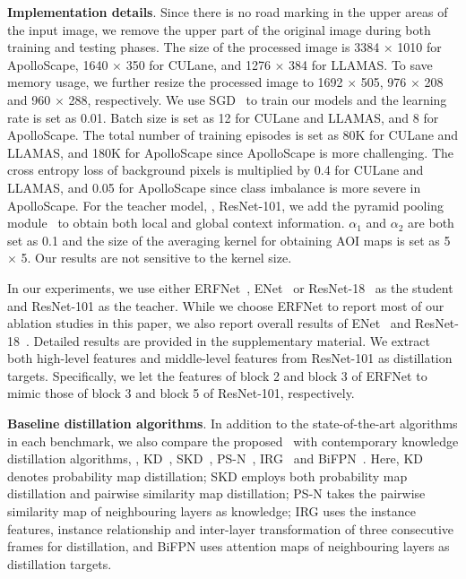 \documentclass[10pt,twocolumn,letterpaper]{article}
\begin{document}
\noindent
\textbf{Implementation details}.
Since there is no road marking in the upper areas of the input image, we remove the upper part of the original image during both training and testing phases. The size of the processed image is 3384 $\times$ 1010 for ApolloScape, 1640 $\times$ 350 for CULane, and 1276 $\times$ 384 for LLAMAS. 
To save memory usage, we further resize the processed image to 1692 $\times$ 505, 976 $\times$ 208 and 960 $\times$ 288, respectively. We use SGD~\cite{bottou2010large} to train our models and the learning rate is set as 0.01. Batch size is set as 12 for CULane and LLAMAS, and 8 for ApolloScape. The total number of training episodes is set as 80K for CULane and LLAMAS, and 180K for ApolloScape since ApolloScape is more challenging. The cross entropy loss of background pixels is multiplied by 0.4 for CULane and LLAMAS, and 0.05 for ApolloScape since class imbalance is more severe in ApolloScape. For the teacher model, \ie, ResNet-101, we add the pyramid pooling module~\cite{zhao2017pyramid} to obtain both local and global context information. $\alpha_{1}$ and $\alpha_{2}$ are both set as 0.1 and the size of the averaging kernel for obtaining AOI maps is set as 5 $\times$ 5. Our results are not sensitive to the kernel size. 

In our experiments, we use either ERFNet~\cite{romera2017erfnet}, ENet~\cite{paszke2016enet} or ResNet-18~\cite{he2016deep} as the student and ResNet-101 as the teacher. While we choose ERFNet to report most of our ablation studies in this paper, we also report overall results of ENet~\cite{paszke2016enet} and ResNet-18~\cite{he2016deep}. Detailed results are provided in the supplementary material.
We extract both high-level features and middle-level features from ResNet-101 as distillation targets. Specifically, we let the features of block 2 and block 3 of ERFNet to mimic those of block 3 and block 5 of ResNet-101, respectively.


\noindent
\textbf{Baseline distillation algorithms}.
In addition to the state-of-the-art algorithms in each benchmark, we also compare the proposed \algorithmname~with contemporary knowledge distillation algorithms, \ie, KD~\cite{hinton2015distilling}, SKD~\cite{liu2019structured}, PS-N~\cite{yim2017gift}, IRG~\cite{liu2019knowledge} and BiFPN~\cite{zhu2018bidirectional}. Here, KD denotes probability map distillation; SKD employs both probability map distillation and pairwise similarity map distillation; PS-N takes the pairwise similarity map of neighbouring layers as knowledge; IRG uses the instance features, instance relationship and inter-layer transformation of three consecutive frames for distillation, and BiFPN uses attention maps of neighbouring layers as distillation targets.
\end{document}
